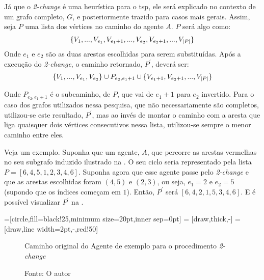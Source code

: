 Já que o \textit{2-change} é uma heurística para o \ac{tsp}, ele será explicado 
no contexto de um grafo completo, $G$, e posteriormente trazido para casos mais 
gerais. Assim, seja $P$ uma lista dos vértices no caminho do agente $A$. 
$P$ será algo como:
\begin{multline*}
\centering
\{V_{1}, ..., V_{e_{1}}, V_{e_{1}+1}, ..., V_{e_{2}}, V_{e_{2}+1}, ..., V_{|P|}\}
\end{multline*}
Onde $e_{1}$ e $e_{2}$ são as duas arestas escolhidas para serem substituídas. 
Após a execução do \textit{2-change}, o caminho retornado, $P^{\prime}$, deverá 
ser:
\begin{multline*}
\centering
$$ \{V_{1}, ..., V_{e_{1}}, V_{e_{2}}\} \cup P_{e_{2}, e_{1}+1} \cup \{V_{e_{1}+1}, V_{e_{2}+1}, ..., V_{|P|}\} $$
\end{multline*}

Onde $P_{e_{2}, e_{1}+1}$ é o subcaminho, de $P$, que vai de $e_{1}+1$ para 
$e_{2}$ invertido. Para o caso dos grafos utilizados nessa pesquisa, que não 
necessariamente são completos, utilizou-se este resultado, $P^{\prime}$, mas 
ao invés de montar o caminho com a aresta que liga quaisquer dois vértices 
consecutivos nessa lista, utilizou-se sempre o menor caminho entre eles.

Veja um exemplo. Suponha que um agente, $A$, que percorre as arestas vermelhas 
no seu subgrafo induzido ilustrado na . O seu ciclo seria 
representado pela lista $P = [6,4,5,1,2,3,4,6]$. Suponha agora que esse agente 
passe pelo \textit{2-change} e que as arestas escolhidas foram $(4,5)$ e $(2,3)$, 
ou seja, $e_{1} = 2$ e $e_{2} = 5$ (supondo que os índices começam em $1$). Então, 
$P^{\prime}$ será $[6,4,2,1,5,3,4,6]$. E é possível visualizar $P^{\prime}$ na 
.

=[circle,fill=black!25,minimum size=20pt,inner sep=0pt]
 = [draw,thick,-]
 = [draw,line width=2pt,-,red!50]

\begin{figure}[h]
	\caption{Caminho original do Agente de exemplo para o procedimento \textit{2-change}}
	\centering
	\caption*{Fonte: O autor}
	\label{2_change_ex1}
\end{figure}

